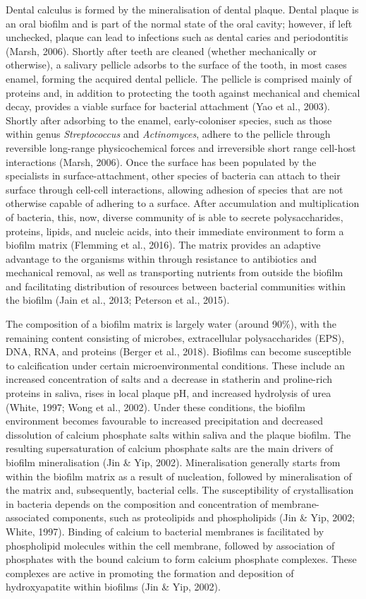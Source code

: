 \documentclass[
]{article}
\begin{document}
Dental calculus is formed by the mineralisation of dental plaque. Dental
plaque is an oral biofilm and is part of the normal state of the oral
cavity; however, if left unchecked, plaque can lead to infections such
as dental caries and periodontitis (Marsh, 2006). Shortly after teeth
are cleaned (whether mechanically or otherwise), a salivary pellicle
adsorbs to the surface of the tooth, in most cases enamel, forming the
acquired dental pellicle. The pellicle is comprised mainly of proteins
and, in addition to protecting the tooth against mechanical and chemical
decay, provides a viable surface for bacterial attachment (Yao et al.,
2003). Shortly after adsorbing to the enamel, early-coloniser species,
such as those within genus \emph{Streptococcus} and \emph{Actinomyces},
adhere to the pellicle through reversible long-range physicochemical
forces and irreversible short range cell-host interactions (Marsh,
2006). Once the surface has been populated by the specialists in
surface-attachment, other species of bacteria can attach to their
surface through cell-cell interactions, allowing adhesion of species
that are not otherwise capable of adhering to a surface. After
accumulation and multiplication of bacteria, this, now, diverse
community of is able to secrete polysaccharides, proteins, lipids, and
nucleic acids, into their immediate environment to form a biofilm matrix
(Flemming et al., 2016). The matrix provides an adaptive advantage to
the organisms within through resistance to antibiotics and mechanical
removal, as well as transporting nutrients from outside the biofilm and
facilitating distribution of resources between bacterial communities
within the biofilm (Jain et al., 2013; Peterson et al., 2015).

The composition of a biofilm matrix is largely water (around 90\%), with
the remaining content consisting of microbes, extracellular
polysaccharides (EPS), DNA, RNA, and proteins (Berger et al., 2018).
Biofilms can become susceptible to calcification under certain
microenvironmental conditions. These include an increased concentration
of salts and a decrease in statherin and proline-rich proteins in
saliva, rises in local plaque pH, and increased hydrolysis of urea
(White, 1997; Wong et al., 2002). Under these conditions, the biofilm
environment becomes favourable to increased precipitation and decreased
dissolution of calcium phosphate salts within saliva and the plaque
biofilm. The resulting supersaturation of calcium phosphate salts are
the main drivers of biofilm mineralisation (Jin \& Yip, 2002).
Mineralisation generally starts from within the biofilm matrix as a
result of nucleation, followed by mineralisation of the matrix and,
subsequently, bacterial cells. The susceptibility of crystallisation in
bacteria depends on the composition and concentration of
membrane-associated components, such as proteolipids and phospholipids
(Jin \& Yip, 2002; White, 1997). Binding of calcium to bacterial
membranes is facilitated by phospholipid molecules within the cell
membrane, followed by association of phosphates with the bound calcium
to form calcium phosphate complexes. These complexes are active in
promoting the formation and deposition of hydroxyapatite within biofilms
(Jin \& Yip, 2002).
\end{document}
